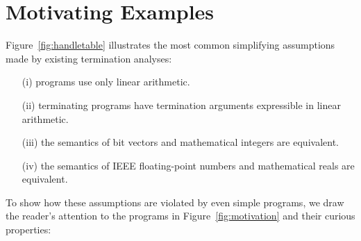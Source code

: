\documentclass[preprint]{sigplanconf}
\theoremstyle{definition}
\begin{document}
\section{Motivating Examples} \label{sec:motivation}

Figure~\ref{fig:handletable} illustrates the most common simplifying
assumptions made by existing termination analyses:
%
\begin{itemize}
\item[(i)] programs use only linear arithmetic.
\item[(ii)] terminating programs have termination arguments expressible in linear arithmetic.
\item[(iii)] the semantics of bit vectors and mathematical integers are equivalent.
\item[(iv)] the semantics of IEEE floating-point numbers and mathematical reals are equivalent.
\end{itemize}  

To show how these assumptions are violated by even simple programs, we draw
the reader's attention to the programs in Figure~\ref{fig:motivation} and
their curious properties:
\end{document}
